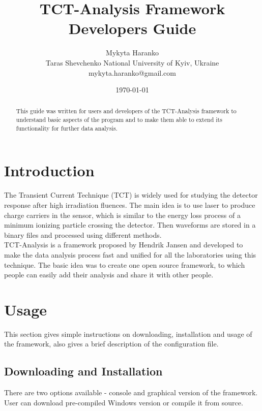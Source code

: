 \documentclass[12pt,oneside,notitlepage,abstracton,a4paper]{scrartcl}
\title{\Large TCT-Analysis Framework Developers Guide}
\author{ Mykyta Haranko \\ \normalsize Taras Shevchenko National University of Kyiv, Ukraine \\ \footnotesize mykyta.haranko@gmail.com }
\date{\normalsize \today}
\begin{document}
\maketitle

\begin{abstract}

\noindent
This guide was written for users and developers of the TCT-Analysis framework to understand basic aspects of the program and to make them able to extend its functionality for further data analysis.
\end{abstract}

\newpage
\tableofcontents
\newpage 

\section{Introduction}\label{intro}

The Transient Current Technique (TCT) is widely used for studying the detector response after high irradiation fluences. The main idea is to use laser to produce charge carriers in the sensor, which is similar to the energy loss process of a minimum ionizing particle crossing the detector\cite{bib:haranko_desy}. Then waveforms are stored in a binary files and processed using different methods.
\\ \indent TCT-Analysis is a framework proposed by Hendrik Jansen and developed to make the data analysis process fast and unified for all the laboratories using this technique. The basic idea was to create one open source framework, to which people can easily add their analysis and share it with other people.

\section{Usage}\label{usage}

This section gives simple instructions on downloading, installation and usage of the framework, also gives a brief description of the configuration file.

\subsection{Downloading and Installation}\label{usage:installation}

There are two options available - console and graphical version of the framework. User can download pre-compiled Windows version or compile it from source.
\end{document}
